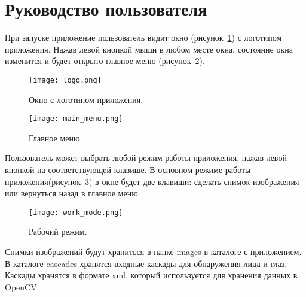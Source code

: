 \section{Руководство пользователя} 
\label{sec:userman}

При запуске приложение пользователь видит окно (рисунок~\ref{fig:logo}) с логотипом приложения.
Нажав левой кнопкой мыши в любом месте окна, состояние окна изменится и будет открыто главное меню (рисунок~\ref{fig:main_menu}).
\begin{figure}[ht]
\centering
    \centering
    \texttt{[image: logo.png]}  
  \caption{Окно с логотипом приложения.}
  \label{fig:logo}
\end{figure}

\begin{figure}[ht]
\centering
    \centering
    \texttt{[image: main\_menu.png]}  
  \caption{Главное меню.}
  \label{fig:main_menu}
\end{figure}

Пользователь может выбрать любой режим работы приложения, нажав левой кнопкой на соответствующей клавише.
В основном режиме работы приложения(рисунок~\ref{fig:work_mode}) в окне будет две клавиши: сделать снимок изображения или вернуться назад в главное меню.
\begin{figure}[ht]
\centering
    \centering
    \texttt{[image: work\_mode.png]}  
  \caption{Рабочий режим.}
  \label{fig:work_mode}
\end{figure}

Снимки изображений будут храниться в папке images в каталоге с приложением. В каталоге cascades хранятся входные каскады для обнаружения лица и глаз. Каскады хранятся в формате xml, который используется для хранения данных в OpenCV

